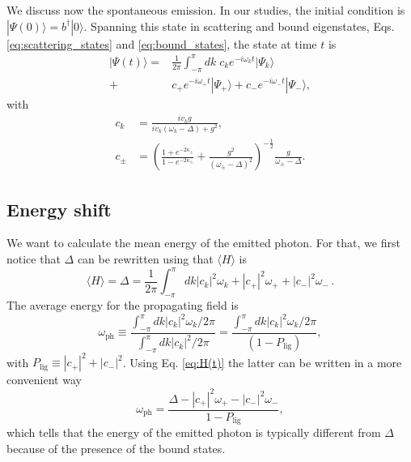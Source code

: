 \documentclass[aps,pra,twocolumn,floatfix,superscriptaddress]{revtex4-1}%
\begin{document}
We discuss now  the spontaneous emission.
In our studies, the  initial condition is $|\Psi(0)\rangle = b^\dagger |0\rangle$. Spanning this state in  scattering and bound eigenstates, Eqs. \eqref{eq:scattering_states} and \eqref{eq:bound_states}, the state at time $t$ is
\begin{align}
|\Psi(t)\rangle = & \frac{1}{2\pi}\int_{-\pi}^\pi dk\;c_ke^{-i\omega_k t}|\Psi_k\rangle \nonumber \\
 + & c_+ e^{-i\omega_+ t} |\Psi_+\rangle + c_- e^{-i\omega_- t} |\Psi_-\rangle, \label{eq:psi(t)}
\end{align}
with
\begin{align} \label{eq:ck}
c_k &  = \frac{iv_k g}{iv_k(\omega_k - \Delta) + g^2},\\
\label{eq:cpm}
c_\pm & =  \left(\frac{1+e^{-2\kappa_\pm}}{1-e^{-2\kappa_\pm}}+\frac{g^2}{(\omega_\pm - \Delta)^2}\right)^{-\frac{1}{2}} \frac{g}{\omega_\pm - \Delta}.
\end{align}

\subsection{Energy shift}

We want to calculate the mean energy of the emitted photon. For that, we first notice that $\Delta$ can be rewritten using that $\langle H\rangle$ is
\begin{equation}\label{eq:H(t)}
\langle H\rangle = \Delta  = \frac{1}{2\pi}\int_{-\pi}^\pi dk |c_k|^2 \omega_k + |c_+|^2 \omega_+ + |c_-|^2 \omega_- \, .
\end{equation}
The  average energy for the propagating field  is
\begin{equation}
\omega_\text{ph} \equiv \frac{\int_{-\pi}^\pi dk |c_k|^2 \omega_k/2\pi}{\int_{-\pi}^\pi dk |c_k|^2/2\pi} = \frac{\int_{-\pi}^\pi dk |c_k|^2 \omega_k/2\pi}{(1-P_\text{lig})},
\end{equation}
with $P_\text{lig} \equiv |c_+|^2 + |c_-|^2$.  
Using Eq. \eqref{eq:H(t)} the latter can be written in a more convenient way
\begin{equation}
\omega_\text{ph} =\frac{\Delta - |c_+|^2 \omega_+ - |c_-|^2 \omega_-}{1-P_\text{lig}}, \label{eq:omega_ph}
\end{equation}
which tells that the energy of the emitted photon is typically different from $\Delta$ because of the presence of the bound states.
\end{document}

